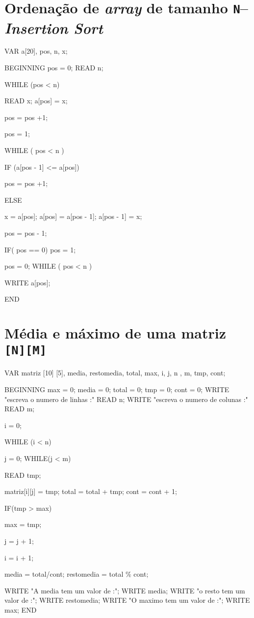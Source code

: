 \section{Ordenação de \emph{array} de tamanho \texttt{N}--\emph{Insertion Sort}}
\label{appendix:d:sec:d4}
VAR a[20], pos, n, x;

BEGINNING
	pos = 0;
	READ n;

	WHILE (pos < n)
	{
	READ x;
	a[pos] = x;

	pos = pos +1;
	
	}

	pos = 1;


	WHILE ( pos < n )
	{
	IF (a[pos - 1] <= a[pos])
	{
	pos = pos +1;
	
	}
	ELSE
	{
	   x = a[pos];
	   a[pos] = a[pos - 1];
	   a[pos - 1] = x;

	   pos = pos - 1;  
              
    	IF( pos == 0)
        {
     		pos = 1;
        }
  
	}
	
	}
        pos = 0;
	WHILE ( pos < n )
	{
        WRITE a[pos];	

	}
END


\section{Média e máximo de uma matriz \texttt{[N][M]}}
\label{appendix:d:sec:d5}

VAR matriz [10] [5], media, restomedia, total, max, i, j, n , m, tmp, cont;

BEGINNING
	max = 0;
	media = 0;
	total = 0;
	tmp = 0;
	cont = 0;
        WRITE "escreva o numero de linhas :"
	READ n;
        WRITE "escreva o numero de colunas :"
	READ m;

	i = 0;

	WHILE (i < n)
	{
	
	        j = 0;
		WHILE(j < m)
		{
	         READ tmp;
                 
		 matriz[i][j] = tmp;
		 total = total + tmp;
		 cont = cont + 1;

		IF(tmp > max)
		{
		max  = tmp;
				       
		}
			
                j = j + 1;		
		}
	
	i = i + 1;
	}

	media = total/cont;
	restomedia = total \% cont;

	WRITE "A media tem um valor de :";
	WRITE media;
	WRITE "o resto tem um valor de :";
	WRITE restomedia;
	WRITE "O maximo tem um valor de :";
	WRITE max;
END


